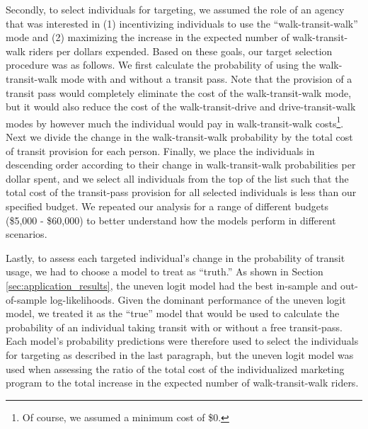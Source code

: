 Secondly, to select individuals for targeting, we assumed the role of an agency that was interested in (1) incentivizing individuals to use the ``walk-transit-walk'' mode and (2) maximizing the increase in the expected number of walk-transit-walk riders per dollars expended. Based on these goals, our target selection procedure was as follows. We first calculate the probability of using the walk-transit-walk mode with and without a transit pass. Note that the provision of a transit pass would completely eliminate the cost of the walk-transit-walk mode, but it would also reduce the cost of the walk-transit-drive and drive-transit-walk modes by however much the individual would pay in walk-transit-walk costs\footnote{Of course, we assumed a minimum cost of \$0.}. Next we divide the change in the walk-transit-walk probability by the total cost of transit provision for each person. Finally, we place the individuals in descending order according to their change in walk-transit-walk probabilities per dollar spent, and we select all individuals from the top of the list such that the total cost of the transit-pass provision for all selected individuals is less than our specified budget. We repeated our analysis for a range of different budgets (\$5,000 - \$60,000) to better understand how the models perform in different scenarios.

Lastly, to assess each targeted individual's change in the probability of transit usage, we had to choose a model to treat as ``truth.'' As shown in Section \ref{sec:application_results}, the uneven logit model had the best in-sample and out-of-sample log-likelihoods. Given the dominant performance of the uneven logit model, we treated it as the ``true'' model that would be used to calculate the probability of an individual taking transit with or without a free transit-pass. Each model's probability predictions were therefore used to select the individuals for targeting as described in the last paragraph, but the uneven logit model was used when assessing the ratio of the total cost of the individualized marketing program to the total increase in the expected number of walk-transit-walk riders.

